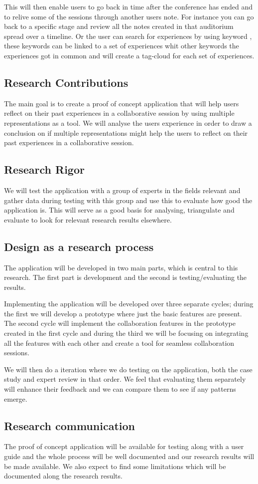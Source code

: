 This will then enable users to go back in time after the conference has ended and to relive some of the sessions through another users note. For instance you can go back to a specific stage and review all the notes created in that auditorium spread over a timeline. Or the user can search for experiences by using keyword \cite{Hassan-montero2006}, these keywords can be linked to a set of experiences whit other keywords the experiences got in common and will create a tag-cloud for each set of experiences.
\subsection{Research Contributions}
The main goal is to create a proof of concept application that will help users reflect on their past experiences in a collaborative session by using multiple representations as a tool. 
We will analyse the users experience in order to draw a conclusion on if multiple representations might help the users to reflect on their past experiences in a collaborative session.
\subsection{Research Rigor}
 We will test the application with a group of experts in the fields relevant and gather data during testing with this group and use this to evaluate how good the application is. This will serve as a good basis for analysing, triangulate and evaluate to look for relevant research results elsewhere.
\subsection{Design as a research process}
The application will be developed in two main parts, which is central to this research. The first part is development and the second is testing/evaluating the results.

Implementing the application will be developed over three separate cycles; during the first we will develop a prototype where just the basic features are present. The second cycle will implement the collaboration features in the prototype created in the first cycle and during the third we will be focusing on integrating all the features with each other and create a tool for seamless collaboration sessions.

We will then do a iteration where we do testing on the application, both the case study and expert review in that order. We feel that evaluating them separately will enhance their feedback and we can compare them to see if any patterns emerge.
\subsection{Research communication}
The proof of concept application will be available for testing along with a user guide and the whole process will be well documented and our research results will be made available.
We also expect to find some limitations which will be documented along the research results.